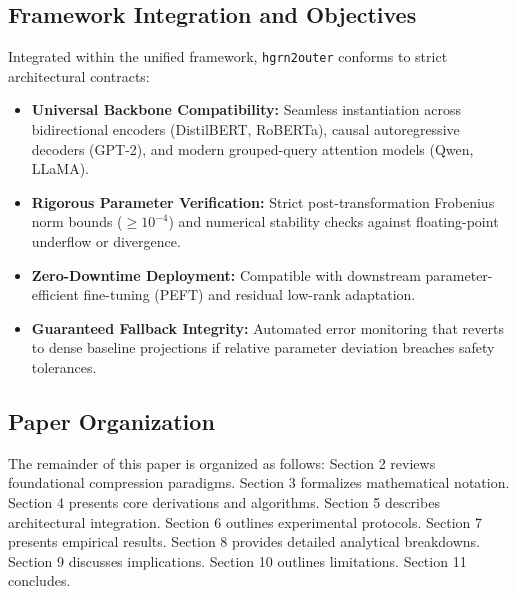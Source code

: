 \subsection{Framework Integration and Objectives}
Integrated within the unified framework, \texttt{hgrn2outer} conforms to strict architectural contracts:
\begin{itemize}
\item \textbf{Universal Backbone Compatibility:} Seamless instantiation across bidirectional encoders (DistilBERT, RoBERTa), causal autoregressive decoders (GPT-2), and modern grouped-query attention models (Qwen, LLaMA).
\item \textbf{Rigorous Parameter Verification:} Strict post-transformation Frobenius norm bounds ($\ge 10^{-4}$) and numerical stability checks against floating-point underflow or divergence.
\item \textbf{Zero-Downtime Deployment:} Compatible with downstream parameter-efficient fine-tuning (PEFT) and residual low-rank adaptation.
\item \textbf{Guaranteed Fallback Integrity:} Automated error monitoring that reverts to dense baseline projections if relative parameter deviation breaches safety tolerances.
\end{itemize}

\subsection{Paper Organization}
The remainder of this paper is organized as follows: Section 2 reviews foundational compression paradigms. Section 3 formalizes mathematical notation. Section 4 presents core derivations and algorithms. Section 5 describes architectural integration. Section 6 outlines experimental protocols. Section 7 presents empirical results. Section 8 provides detailed analytical breakdowns. Section 9 discusses implications. Section 10 outlines limitations. Section 11 concludes.
